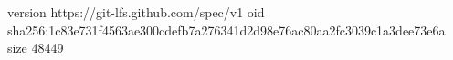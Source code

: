 version https://git-lfs.github.com/spec/v1
oid sha256:1c83e731f4563ae300cdefb7a276341d2d98e76ac80aa2fc3039c1a3dee73e6a
size 48449
